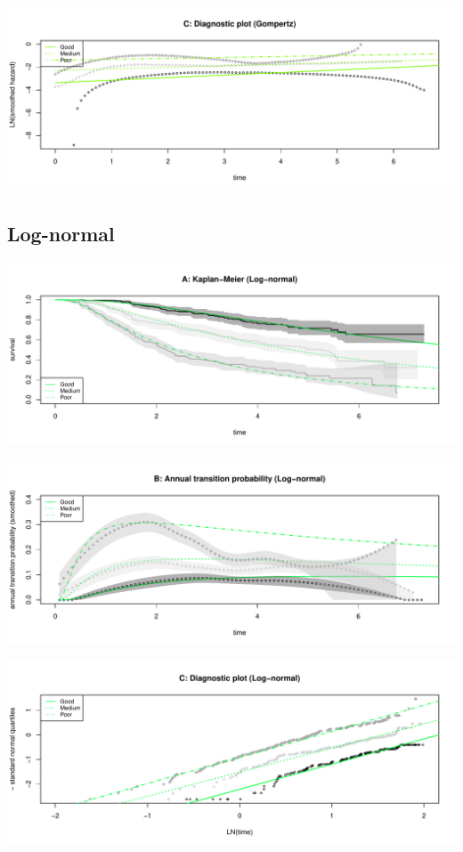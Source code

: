 \documentclass[]{article}
\begin{document}
\begin{flushleft}\includegraphics[height=0.3\textheight]{images/gom-3} \end{flushleft}

\subsection{Log-normal}\label{log-normal}

\begin{flushleft}\includegraphics[height=0.3\textheight]{images/lnorm-1} \end{flushleft}

\begin{flushleft}\includegraphics[height=0.3\textheight]{images/lnorm-2} \end{flushleft}

\begin{flushleft}\includegraphics[height=0.3\textheight]{images/lnorm-3} \end{flushleft}
\end{document}

